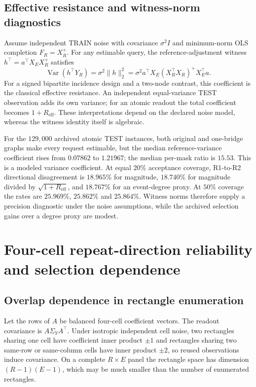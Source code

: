 \subsection{Effective resistance and witness-norm diagnostics}
Assume independent TRAIN noise with covariance $\sigma^2 I$ and minimum-norm OLS completion $F_R=X_R^+$. For any estimable query, the reference-adjustment witness $h^\top=a^\top X_EX_R^+$ satisfies
\begin{equation}\label{eq:reff-s}
\operatorname{Var}(h^\top Y_R)=\sigma^2\|h\|_2^2
=\sigma^2a^\top X_E(X_R^\top X_R)^+X_E^\top a.
\end{equation}
For a signed bipartite incidence design and a two-node contrast, this coefficient is the classical effective resistance. An independent equal-variance TEST observation adds its own variance; for an atomic readout the total coefficient becomes $1+R_{\mathrm{eff}}$. These interpretations depend on the declared noise model, whereas the witness identity itself is algebraic.

For the $129{,}000$ archived atomic TEST instances, both original and one-bridge graphs make every request estimable, but the median reference-variance coefficient rises from $0.07862$ to $1.21967$; the median per-mask ratio is $15.53$. This is a modeled variance coefficient. At equal $20\%$ acceptance coverage, R1-to-R2 directional disagreement is $18.965\%$ for magnitude, $18.740\%$ for magnitude divided by $\sqrt{1+R_{\mathrm{eff}}}$, and $18.767\%$ for an event-degree proxy. At $50\%$ coverage the rates are $25.969\%$, $25.862\%$ and $25.864\%$. Witness norms therefore supply a precision diagnostic under the noise assumptions, while the archived selection gains over a degree proxy are modest.

\par
\section{Four-cell repeat-direction reliability and selection dependence}
\label{supp:q4}
\subsection{Overlap dependence in rectangle enumeration}
Let the rows of $A$ be balanced four-cell coefficient vectors. The readout covariance is $A\Sigma_YA^\top$. Under isotropic independent cell noise, two rectangles sharing one cell have coefficient inner product $\pm1$ and rectangles sharing two same-row or same-column cells have inner product $\pm2$, so reused observations induce covariance. On a complete $R\times E$ panel the rectangle space has dimension $(R-1)(E-1)$, which may be much smaller than the number of enumerated rectangles.


